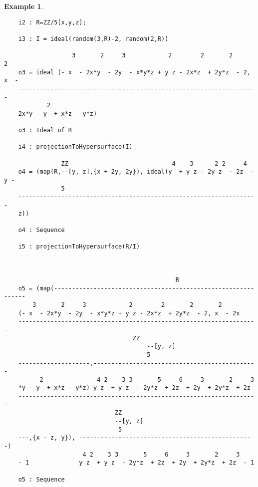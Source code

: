 \documentclass[11pt]{amsart}
\theoremstyle{definition}
\newtheorem{example}{Example}[section]
\begin{document}
\vspace{1em}
\begin{example}
	{{\small\color{blue}
	\begin{verbatim}
	i2 : R=ZZ/5[x,y,z];
	
	i3 : I = ideal(random(3,R)-2, random(2,R))
	
	               3       2     3            2        2       2       2  
	o3 = ideal (- x  - 2x*y  - 2y  - x*y*z + y z - 2x*z  + 2y*z  - 2, x  -
	-------------------------------------------------------------------
	        2
	2x*y - y  + x*z - y*z)
	
	o3 : Ideal of R
	
	i4 : projectionToHypersurface(I)
	
	            ZZ                             4    3      2 2     4
	o4 = (map(R,--[y, z],{x + 2y, 2y}), ideal(y  + y z - 2y z  - 2z  - y -
	            5
	-------------------------------------------------------------------
	z))
	
	o4 : Sequence
	
	i5 : projectionToHypersurface(R/I)
	
	
	
                           	                    R                    
	o5 = (map(--------------------------------------------------------------
	    3       2     3            2        2       2       2     
	(- x  - 2x*y  - 2y  - x*y*z + y z - 2x*z  + 2y*z  - 2, x  - 2x
	-------------------------------------------------------------------
                                    ZZ                       
	                                    --[y, z]                 
	                                    5                       
	--------------------,----------------------------------------------
	      2               4 2    3 3       5     6     3       2     3 
	*y - y  + x*z - y*z) y z  + y z  - 2y*z  + 2z  + 2y  + 2y*z  + 2z  
	-------------------------------------------------------------------
                    	       ZZ
                	           --[y, z]
	                            5
	---,{x - z, y}), -------------------------------------------------)
	                  4 2    3 3       5     6     3       2     3
	- 1              y z  + y z  - 2y*z  + 2z  + 2y  + 2y*z  + 2z  - 1
	
	o5 : Sequence
	
	\end{verbatim}
}}
\end{example}


\end{document}
